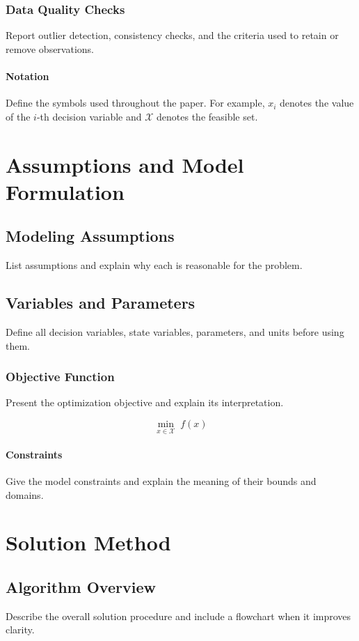 \documentclass[11pt,a4paper]{article}
\begin{document}
\subsubsection{Data Quality Checks}
Report outlier detection, consistency checks, and the criteria used to retain or remove
observations.

\paragraph{Notation}
Define the symbols used throughout the paper. For example, $x_i$ denotes the value of
the $i$-th decision variable and $\mathcal{X}$ denotes the feasible set.

\section{Assumptions and Model Formulation}
\subsection{Modeling Assumptions}
List assumptions and explain why each is reasonable for the problem.

\subsection{Variables and Parameters}
Define all decision variables, state variables, parameters, and units before using them.

\subsubsection{Objective Function}
Present the optimization objective and explain its interpretation.

\begin{equation}
  \min_{x \in \mathcal{X}}\; f(x)
  \label{eq:objective}
\end{equation}

\paragraph{Constraints}
Give the model constraints and explain the meaning of their bounds and domains.

\section{Solution Method}
\subsection{Algorithm Overview}
Describe the overall solution procedure and include a flowchart when it improves clarity.
\end{document}
